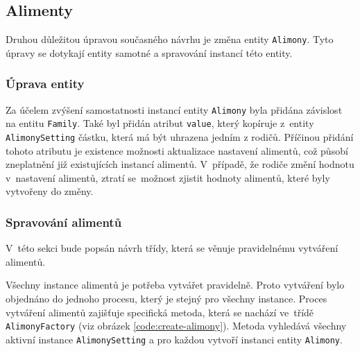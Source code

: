     \subsection{Alimenty}\label{navrh:upravy:alimenty}
        Druhou důležitou úpravou současného návrhu je změna entity \verb|Alimony|. Tyto úpravy se dotykají entity samotné a spravování instancí této entity.
    
        \subsubsection{Úprava entity}
            Za účelem zvýšení samostatnosti instancí entity \verb|Alimony| byla přidána závislost na entitu \verb|Family|. Také byl přidán atribut \verb|value|, který kopíruje z~entity \verb|AlimonySetting| částku, která má být uhrazena jedním z rodičů. Příčinou přidání tohoto atributu je existence možnosti aktualizace nastavení alimentů, což působí zneplatnění již existujících instancí alimentů. V~případě, že rodiče změní hodnotu v~nastavení alimentů, ztratí se~možnost zjistit hodnoty alimentů, které byly vytvořeny do změny.
            
        \subsubsection{Spravování alimentů} 
            V~této sekci bude popsán návrh třídy, která se věnuje pravidelnému vytváření alimentů.
            
            Všechny instance alimentů je potřeba vytvářet pravidelně. Proto vytváření bylo objednáno do jednoho procesu, který je stejný pro všechny instance. Proces vytváření alimentů zajišťuje specifická metoda, která se nachází ve~třídě \verb|AlimonyFactory| (viz obrázek \ref{code:create-alimony}). Metoda vyhledává všechny aktivní instance \verb|AlimonySetting| a pro každou vytvoří instanci entity \verb|Alimony|. 
            
